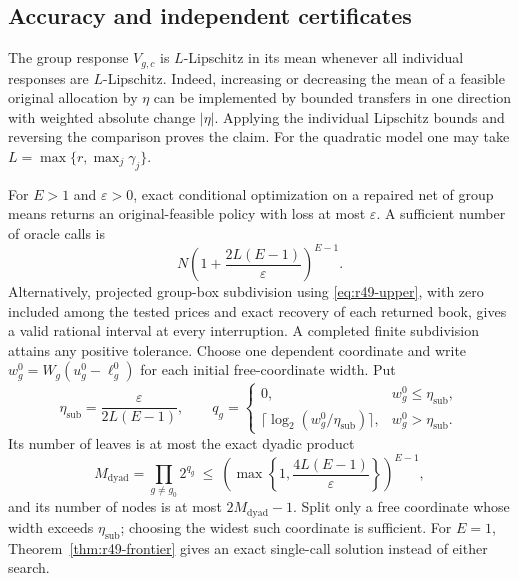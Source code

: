 \subsection{Accuracy and independent certificates}
The group response $V_{g,c}$ is $L$-Lipschitz in its mean whenever all individual responses are $L$-Lipschitz. Indeed, increasing or decreasing the mean of a feasible original allocation by $\eta$ can be implemented by bounded transfers in one direction with weighted absolute change $|\eta|$. Applying the individual Lipschitz bounds and reversing the comparison proves the claim. For the quadratic model one may take $L=\max\{r,\max_j\gamma_j\}$.

\begin{theorem}\label{thm:r49-accuracy}
For $E>1$ and $\varepsilon>0$, exact conditional optimization on a repaired net of group means returns an original-feasible policy with loss at most $\varepsilon$. A sufficient number of oracle calls is
\begin{equation}\label{eq:r49-net-count}
 N\left(1+\frac{2L(E-1)}{\varepsilon}\right)^{E-1}.
\end{equation}
Alternatively, projected group-box subdivision using \eqref{eq:r49-upper}, with zero included among the tested prices and exact recovery of each returned book, gives a valid rational interval at every interruption. A completed finite subdivision attains any positive tolerance. Choose one dependent coordinate and write $w_g^0=W_g(u_g^0-\ell_g^0)$ for each initial free-coordinate width. Put
\begin{equation}\label{eq:r51-dyadic-step}
 \eta_{\mathrm{sub}}=\frac{\varepsilon}{2L(E-1)},\qquad
 q_g=\begin{cases}0,&w_g^0\leq\eta_{\mathrm{sub}},\\
 \lceil\log_2(w_g^0/\eta_{\mathrm{sub}})\rceil,&w_g^0>\eta_{\mathrm{sub}}.
 \end{cases}
\end{equation}
Its number of leaves is at most the exact dyadic product
\begin{equation}\label{eq:r49-cover-count}
 M_{\mathrm{dyad}}=\prod_{g\ne g_0}2^{q_g}
 \ \leq\ \left(\max\left\{1,\frac{4L(E-1)}{\varepsilon}\right\}\right)^{E-1},
\end{equation}
and its number of nodes is at most $2M_{\mathrm{dyad}}-1$. Split only a free coordinate whose width exceeds $\eta_{\mathrm{sub}}$; choosing the widest such coordinate is sufficient. For $E=1$, Theorem~\ref{thm:r49-frontier} gives an exact single-call solution instead of either search.
\end{theorem}
